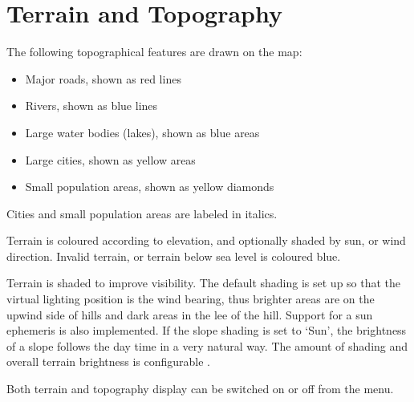 \section{Terrain and Topography}\label{sec:terrain_topo}

The following topographical features are drawn on the map:
\begin{itemize}
\item Major roads, shown as red lines
\item Rivers, shown as blue lines
\item Large water bodies (lakes), shown as blue areas
\item Large cities, shown as yellow areas
\item Small population areas, shown as yellow diamonds
\end{itemize}
Cities and small population areas are labeled in italics.

Terrain is coloured according to elevation, and optionally shaded by sun, or 
wind direction.  Invalid terrain, or terrain below
sea level is coloured blue.


Terrain is shaded to improve visibility.  The default shading
is set up so that the virtual lighting position is the wind bearing,
thus brighter areas are on the upwind side of hills and dark areas in
the lee of the hill.  
Support for a sun ephemeris is also implemented. If the slope shading is set 
to `Sun', the brightness of a slope follows the day time in a very natural way.
The amount of shading and overall terrain brightness is configurable .

Both terrain and topography display can be switched on or off from the
menu.

